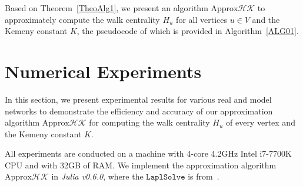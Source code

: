 \documentclass[journal]{IEEEtran}
\begin{document}
Based on Theorem~\ref{TheoAlg1}, we  present an algorithm \(\text{Approx}\mathcal{HK}\) to approximately compute the walk centrality \(H_u\) for all  vertices  \(u \in V\) and the Kemeny constant \(K\), the pseudocode of which is provided in Algorithm~\ref{ALG01}.


\section{Numerical Experiments}

In this section, we present experimental results for various real and model networks to demonstrate the  efficiency and accuracy of our approximation algorithm \(\text{Approx}\mathcal{HK}\) for computing the walk centrality \(H_u\) of  every vertex and the Kemeny constant \(K\).

All   experiments are conducted on  a machine  with 4-core 4.2GHz  Intel i7-7700K CPU and with  32GB of RAM. We implement the approximation algorithm \(\text{Approx}\mathcal{HK}\) in \textit{Julia v0.6.0}, where  the \(\mathtt{LaplSolve}\) is from~\cite{KySa16}. %
\end{document}
